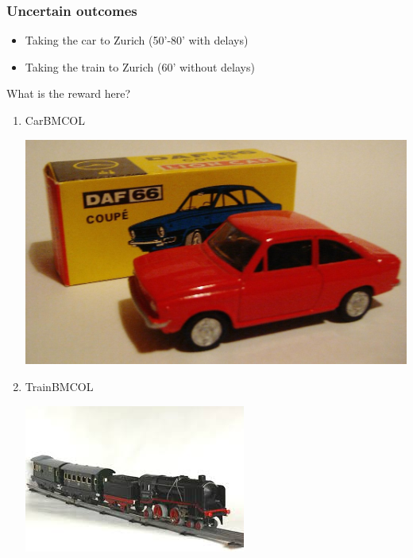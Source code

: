\documentclass[smaller]{article}
\begin{document}
\subsubsection{Uncertain outcomes}
\label{sec:org86a592e}
\begin{itemize}
\item\relax [A] Taking the car to Zurich (50'-80' with delays)
\item\relax [B] Taking the train to Zurich (60' without delays)
\end{itemize}
What is the reward here? 

\begin{enumerate}
\item Car\hfill{}\textsc{BMCOL}
\label{sec:orge479724}
\begin{center}
\includegraphics[width=.9\linewidth]{./figures/car.jpg}
\end{center}
\item Train\hfill{}\textsc{BMCOL}
\label{sec:org28df417}
\begin{center}
\includegraphics[width=.9\linewidth]{./figures/train.jpeg}
\end{center}
\end{enumerate}
\end{document}
